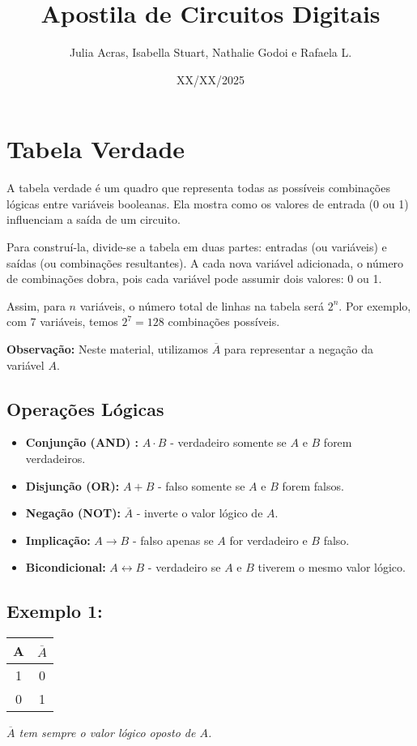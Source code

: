 \documentclass[12pt]{article}
\title{Apostila de Circuitos Digitais}
\author{Julia Acras, Isabella Stuart, Nathalie Godoi e Rafaela L.}
\date{XX/XX/2025}
\begin{document}
\maketitle

\tableofcontents

\section{Tabela Verdade}
A tabela verdade é um quadro que representa todas as possíveis combinações lógicas entre variáveis booleanas. Ela mostra como os valores de entrada (0 ou 1) influenciam a saída de um circuito.

Para construí-la, divide-se a tabela em duas partes: entradas (ou variáveis) e saídas (ou combinações resultantes). A cada nova variável adicionada, o número de combinações dobra, pois cada variável pode assumir dois valores: 0 ou 1.

Assim, para \( n \) variáveis, o número total de linhas na tabela será \( 2^n \). Por exemplo, com 7 variáveis, temos \( 2^7 = 128 \) combinações possíveis.

\textbf{Observação:} Neste material, utilizamos \( \overline{A} \) para representar a negação da variável \( A \).

\subsection*{Operações Lógicas}
\begin{itemize}
   \item \textbf{Conjunção (AND) :} \( A \cdot B \) - verdadeiro somente se \( A \) e \( B \) forem verdadeiros.
   \item \textbf{Disjunção (OR):} \( A + B \) - falso somente se \( A\) e \( B \) forem falsos.
   \item \textbf{Negação (NOT):} \( \overline{A} \) - inverte o valor lógico de \( A \).
   \item \textbf{Implicação:} \( A \rightarrow B \) - falso apenas se \( A \) for verdadeiro e \( B \) falso.
   \item \textbf{Bicondicional:} \( A \leftrightarrow B \) - verdadeiro se \( A \) e \( B \) tiverem o mesmo valor lógico.
\end{itemize}


\subsection*{Exemplo 1:}
\begin{center}
\begin{tabular}{|c|c|}
\hline
A & \( \overline{A} \) \\
\hline
1 & 0 \\
0 & 1 \\
\hline
\end{tabular}

\vspace{0.5em}
\textit{$\overline{A}$ tem sempre o valor lógico oposto de $A$.}
\end{center}
\end{document}
